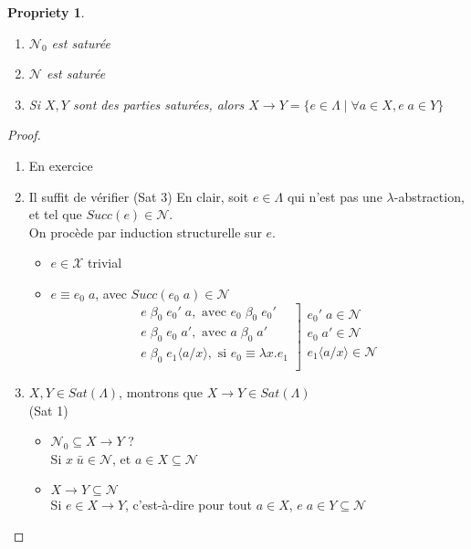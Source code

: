 \documentclass{article}
\newtheorem{prop}{Propriety}
\newcommand\subst[2]{\langle #1\big/#2\rangle}
\newcommand\lterm[2]{\lambda #1. #2}
\newcommand\tlambda[0]{$\lambda$}
\begin{document}
\begin{prop}
\begin{enumerate}[noitemsep,label=\roman*)]
\item $\mathcal{N}_0$ est saturée
\item $\mathcal{N}$ est saturée
\item Si $X, Y$ sont des parties saturées, alors $X \to Y = \{ e\in \Lambda \;|\; \forall a\in X, e\; a \in Y\}$
\end{enumerate}
\end{prop}
\begin{proof}
\begin{enumerate}[noitemsep,label=\roman*)]
\item En exercice
\item Il suffit de vérifier (Sat 3)
En clair, soit $e\in \Lambda$ qui n'est pas une \tlambda-abstraction, et tel que $Succ(e)\in \mathcal{N}$.\\
On procède par induction structurelle sur $e$.
\begin{itemize}[label=*]
\item $e\in \mathcal{X}$ trivial
\item $e\equiv e_0\; a$, avec $Succ (e_0\; a)\in \mathcal{N}$
\[
\left.
\begin{array}{r}
e\;\beta_0\; e_0'\; a, \text{ avec } e_0\;\beta_0\; e_0'\\
e\;\beta_0\; e_0\; a', \text{ avec } a\;\beta_0\; a'\\
e\;\beta_0\; e_1\subst{a}{x}, \text{ si } e_0\equiv\lterm{x}{e_1}\\
\end{array}
\right]
\begin{array}{l}
e_0'\; a \in \mathcal{N}\\
e_0\; a'\in \mathcal{N}\\
e_1\subst{a}{x}\in \mathcal{N}\\
\end{array}
\]
\end{itemize}
\item $X,Y\in Sat(\Lambda)$, montrons que $X\to Y\in Sat(\Lambda)$\\
(Sat 1)
\begin{itemize}[label=*]
\item $\mathcal{N}_0\subseteq X \to Y$ ?\\
Si $x\;\bar{u}\in \mathcal{N}$, et $a\in X \subseteq \mathcal{N}$
\item $X\to Y\subseteq \mathcal{N}$\\
Si $e\in X\to Y$, c'est-à-dire pour tout $a\in X$, $e\; a \in Y \subseteq \mathcal{N}$
\end{itemize}
\smallskip



\end{enumerate}
\end{proof}
\end{document}
